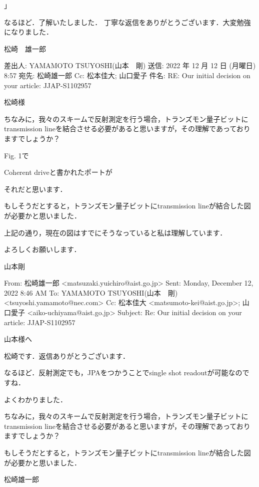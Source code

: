 」

なるほど．了解いたしました．
丁寧な返信をありがとうございます．大変勉強になりました．

松崎　雄一郎


差出人: YAMAMOTO TSUYOSHI(山本　剛)
送信: 2022 年 12 月 12 日 (月曜日) 8:57
宛先: 松崎雄一郎
Cc: 松本佳大; 山口愛子
件名: RE: Our initial decision on your article: JJAP-S1102957

松崎様

 

ちなみに，我々のスキームで反射測定を行う場合，トランズモン量子ビットにtransmission lineを結合させる必要があると思いますが，その理解であっておりますでしょうか？
 

Fig. 1で

Coherent driveと書かれたポートが

それだと思います．

 

もしそうだとすると，トランズモン量子ビットにtransmission lineが結合した図が必要かと思いました．
 

上記の通り，現在の図はすでにそうなっていると私は理解しています．

 

よろしくお願いします．

山本剛

From: 松崎雄一郎 <matsuzaki.yuichiro@aist.go.jp>
Sent: Monday, December 12, 2022 8:46 AM
To: YAMAMOTO TSUYOSHI(山本　剛) <tsuyoshi.yamamoto@nec.com>
Cc: 松本佳大 <matsumoto-kei@aist.go.jp>; 山口愛子 <aiko-uchiyama@aist.go.jp>
Subject: Re: Our initial decision on your article: JJAP-S1102957

 

山本様へ

 

松崎です．返信ありがとうございます．

なるほど．反射測定でも，JPAをつかうことでsingle shot readoutが可能なのですね．

よくわかりました．

 

ちなみに，我々のスキームで反射測定を行う場合，トランズモン量子ビットにtransmission lineを結合させる必要があると思いますが，その理解であっておりますでしょうか？

 

もしそうだとすると，トランズモン量子ビットにtransmission lineが結合した図が必要かと思いました．

 

松崎雄一郎

